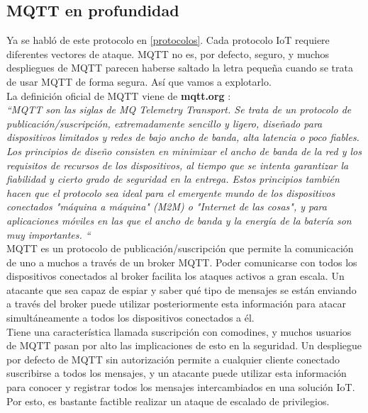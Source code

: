 \subsection{MQTT en profundidad}

Ya se habló de este protocolo en \ref{protocolos}. Cada protocolo IoT requiere diferentes vectores de ataque. MQTT no es, por defecto, seguro, y muchos despliegues de MQTT parecen haberse saltado la letra pequeña cuando se trata de usar MQTT de forma segura. Así que vamos a explotarlo. \\

La definición oficial de MQTT viene de \textbf{mqtt.org} \cite{mqtt}: \\

\textit{``MQTT son las siglas de MQ Telemetry Transport. Se trata de un protocolo de publicación/suscripción, extremadamente sencillo y ligero, diseñado para dispositivos limitados y redes de bajo ancho de banda, alta latencia o poco fiables. Los principios de diseño consisten en minimizar el ancho de banda de la red y los requisitos de recursos de los dispositivos, al tiempo que se intenta garantizar la fiabilidad y cierto grado de seguridad en la entrega. Estos principios también hacen que el protocolo sea ideal para el emergente mundo de los dispositivos conectados "máquina a máquina" (M2M) o "Internet de las cosas", y para aplicaciones móviles en las que el ancho de banda y la energía de la batería son muy importantes. ``} \\


MQTT es un protocolo de publicación/suscripción que permite la comunicación de uno a muchos a través de un broker MQTT. Poder comunicarse con todos los dispositivos conectados al broker facilita los ataques activos a gran escala. Un atacante que sea capaz de espiar y saber qué tipo de mensajes se están enviando a través del broker puede utilizar posteriormente esta información para atacar simultáneamente a todos los dispositivos conectados a él. \\

Tiene una característica llamada suscripción con comodines, y muchos usuarios de MQTT pasan por alto las implicaciones de esto en la seguridad. Un despliegue por defecto de MQTT sin autorización permite a cualquier cliente conectado suscribirse a todos los mensajes, y un atacante puede utilizar esta información para conocer y registrar todos los mensajes intercambiados en una solución IoT. Por esto, es bastante factible realizar un ataque de escalado de privilegios. \cite{mqtt-security-1} \\


